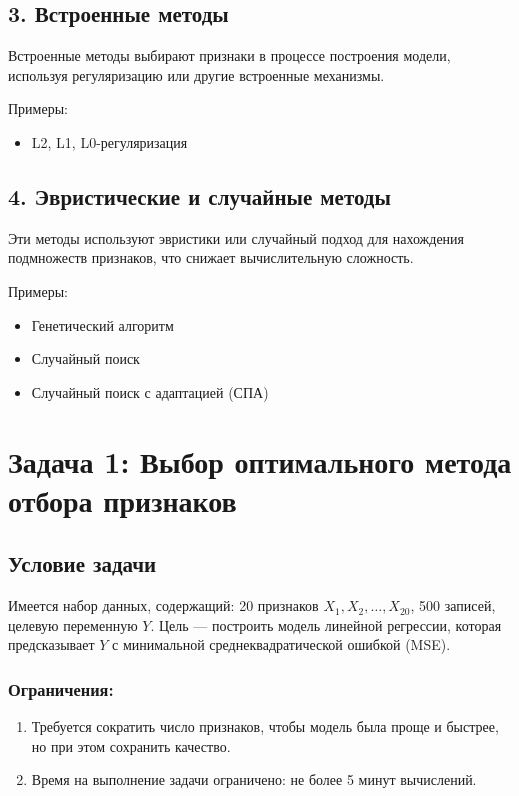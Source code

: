 \subsection*{3. Встроенные методы}
Встроенные методы выбирают признаки в процессе построения модели, используя регуляризацию или другие встроенные механизмы.  

Примеры:
\begin{itemize}
    \item L2, L1, L0-регуляризация 
\end{itemize}

\subsection*{4. Эвристические и случайные методы}
Эти методы используют эвристики или случайный подход для нахождения подмножеств признаков, что снижает вычислительную сложность.  

Примеры:
\begin{itemize}
    \item Генетический алгоритм
    \item Случайный поиск 
    \item Случайный поиск с адаптацией (СПА) 
\end{itemize}

\section*{Задача 1: Выбор оптимального метода отбора признаков}

\subsection*{Условие задачи}
Имеется набор данных, содержащий: 20 признаков \( X_1, X_2, \dots, X_{20} \), 500 записей, целевую переменную \( Y \). 
Цель — построить модель линейной регрессии, которая предсказывает \( Y \) с минимальной среднеквадратической ошибкой (MSE).  
\subsubsection*{Ограничения:}
\begin{enumerate}
    \item Требуется сократить число признаков, чтобы модель была проще и быстрее, но при этом сохранить качество.  
    \item Время на выполнение задачи ограничено: не более 5 минут вычислений.  
\end{enumerate}

